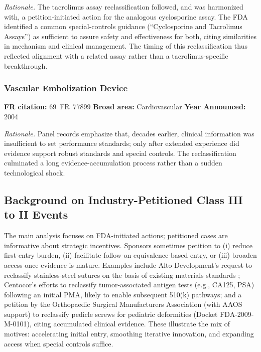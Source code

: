 \documentclass[letterpaper,12pt]{article}
\theoremstyle{definition}
\begin{document}
\textit{Rationale.} The tacrolimus assay reclassification followed, and was harmonized with, a petition-initiated action for the analogous cyclosporine assay. The FDA identified a common special-controls guidance (“Cyclosporine and Tacrolimus Assays”) as sufficient to assure safety and effectiveness for both, citing similarities in mechanism and clinical management. The timing of this reclassification thus reflected alignment with a related assay rather than a tacrolimus-specific breakthrough.




\subsubsection*{Vascular Embolization Device}
\textbf{FR citation:} 69~FR~77899 \quad \textbf{Broad area:} Cardiovascular \quad \textbf{Year Announced:} 2004

\textit{Rationale.} Panel records emphasize that, decades earlier, clinical information was insufficient to set performance standards; only after extended experience did evidence support robust standards and special controls. The reclassification culminated a long evidence-accumulation process rather than a sudden technological shock.





\subsection{Background on Industry-Petitioned Class III to II Events}\label{sec:IndustryPetition}


The main analysis focuses on FDA-initiated actions; petitioned cases are informative about strategic incentives. Sponsors sometimes petition to (i) reduce first-entry burden, (ii) facilitate follow-on equivalence-based entry, or (iii) broaden access once evidence is mature. Examples include Alto Development’s request to reclassify stainless-steel sutures on the basis of existing materials standards \citep{KahanJonathan:1987}; Centocor’s efforts to reclassify tumor-associated antigen tests (e.g., CA125, PSA) following an initial PMA, likely to enable subsequent 510(k) pathways; and a petition by the Orthopaedic Surgical Manufacturers Association (with AAOS support) to reclassify pedicle screws for pediatric deformities (Docket FDA-2009-M-0101), citing accumulated clinical evidence. These illustrate the mix of motives: accelerating initial entry, smoothing iterative innovation, and expanding access when special controls suffice.
\end{document}
